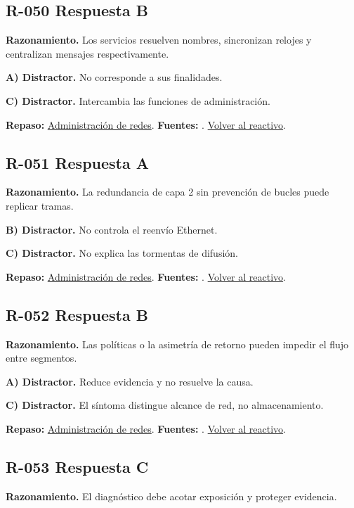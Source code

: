 \subsection*{R-050 \quad Respuesta B}\label{s:R-050}
\textbf{Razonamiento.} Los servicios resuelven nombres, sincronizan relojes y centralizan mensajes respectivamente.

\textbf{A) Distractor. }No corresponde a sus finalidades.

\textbf{C) Distractor. }Intercambia las funciones de administración.

\textbf{Repaso:} \hyperref[sec:r2]{Administración de redes}. \textbf{Fuentes:} \cite{rfc2131,rfc1034,rfc9293,networks}. \hyperref[q:R-050]{Volver al reactivo}.\par\medskip

\subsection*{R-051 \quad Respuesta A}\label{s:R-051}
\textbf{Razonamiento.} La redundancia de capa 2 sin prevención de bucles puede replicar tramas.

\textbf{B) Distractor. }No controla el reenvío Ethernet.

\textbf{C) Distractor. }No explica las tormentas de difusión.

\textbf{Repaso:} \hyperref[sec:r2]{Administración de redes}. \textbf{Fuentes:} \cite{rfc2131,rfc1034,rfc9293,networks}. \hyperref[q:R-051]{Volver al reactivo}.\par\medskip

\subsection*{R-052 \quad Respuesta B}\label{s:R-052}
\textbf{Razonamiento.} Las políticas o la asimetría de retorno pueden impedir el flujo entre segmentos.

\textbf{A) Distractor. }Reduce evidencia y no resuelve la causa.

\textbf{C) Distractor. }El síntoma distingue alcance de red, no almacenamiento.

\textbf{Repaso:} \hyperref[sec:r2]{Administración de redes}. \textbf{Fuentes:} \cite{rfc2131,rfc1034,rfc9293,networks}. \hyperref[q:R-052]{Volver al reactivo}.\par\medskip

\subsection*{R-053 \quad Respuesta C}\label{s:R-053}
\textbf{Razonamiento.} El diagnóstico debe acotar exposición y proteger evidencia.

